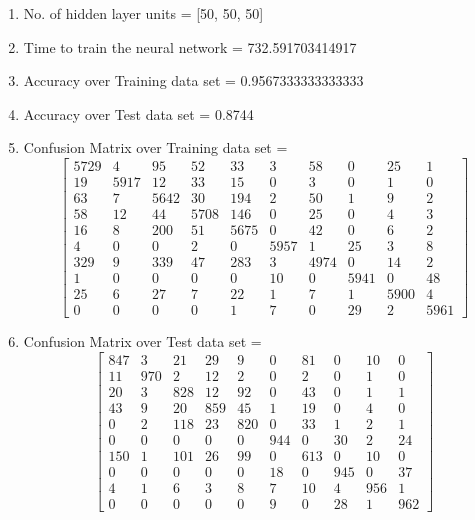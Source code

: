 \documentclass[11pt]{article}
\begin{document}
\hline
\begin{enumerate}
\item No. of hidden layer units = [50, 50, 50]
\item Time to train the neural network = 732.591703414917
\item Accuracy over Training data set = 0.9567333333333333
\item Accuracy over Test data set = 0.8744
\item Confusion Matrix over Training data set = 
\begin{equation}
  \begin{bmatrix}
5729 & 4 & 95 & 52 & 33 & 3 & 58 & 0 & 25 & 1\\
19 & 5917 & 12 & 33 & 15 & 0 & 3 & 0 & 1 & 0\\
63 & 7 & 5642 & 30 & 194 & 2 & 50 & 1 & 9 & 2\\
58 & 12 & 44 & 5708 & 146 & 0 & 25 & 0 & 4 & 3\\
16 & 8 & 200 & 51 & 5675 & 0 & 42 & 0 & 6 & 2\\
4 & 0 & 0 & 2 & 0 & 5957 & 1 & 25 & 3 & 8\\
329 & 9 & 339 & 47 & 283 & 3 & 4974 & 0 & 14 & 2\\
1 & 0 & 0 & 0 & 0 & 10 & 0 & 5941 & 0 & 48\\
25 & 6 & 27 & 7 & 22 & 1 & 7 & 1 & 5900 & 4\\
0 & 0 & 0 & 0 & 1 & 7 & 0 & 29 & 2 & 5961
  \end{bmatrix}
\end{equation}
\item Confusion Matrix over Test data set = 
\begin{equation}
  \begin{bmatrix}
847 & 3 & 21 & 29 & 9 & 0 & 81 & 0 & 10 & 0\\
11 & 970 & 2 & 12 & 2 & 0 & 2 & 0 & 1 & 0\\
20 & 3 & 828 & 12 & 92 & 0 & 43 & 0 & 1 & 1\\
43 & 9 & 20 & 859 & 45 & 1 & 19 & 0 & 4 & 0\\
0 & 2 & 118 & 23 & 820 & 0 & 33 & 1 & 2 & 1\\
0 & 0 & 0 & 0 & 0 & 944 & 0 & 30 & 2 & 24\\
150 & 1 & 101 & 26 & 99 & 0 & 613 & 0 & 10 & 0\\
0 & 0 & 0 & 0 & 0 & 18 & 0 & 945 & 0 & 37\\
4 & 1 & 6 & 3 & 8 & 7 & 10 & 4 & 956 & 1\\
0 & 0 & 0 & 0 & 0 & 9 & 0 & 28 & 1 & 962
  \end{bmatrix}
\end{equation}
\end{enumerate}
\end{document}
